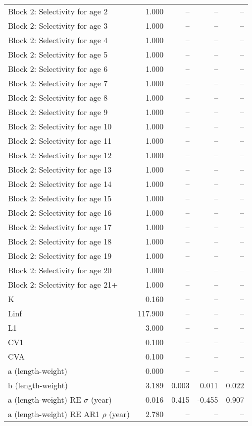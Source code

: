 \documentclass[
]{article}
\begin{document}
\begin{landscape}
\begin{longtable}[t]{lrrrr}
Block 2: Selectivity for age 2 & 1.000 & -- & -- & --\\
Block 2: Selectivity for age 3 & 1.000 & -- & -- & --\\
Block 2: Selectivity for age 4 & 1.000 & -- & -- & --\\
Block 2: Selectivity for age 5 & 1.000 & -- & -- & --\\
\addlinespace
Block 2: Selectivity for age 6 & 1.000 & -- & -- & --\\
Block 2: Selectivity for age 7 & 1.000 & -- & -- & --\\
Block 2: Selectivity for age 8 & 1.000 & -- & -- & --\\
Block 2: Selectivity for age 9 & 1.000 & -- & -- & --\\
Block 2: Selectivity for age 10 & 1.000 & -- & -- & --\\
\addlinespace
Block 2: Selectivity for age 11 & 1.000 & -- & -- & --\\
Block 2: Selectivity for age 12 & 1.000 & -- & -- & --\\
Block 2: Selectivity for age 13 & 1.000 & -- & -- & --\\
Block 2: Selectivity for age 14 & 1.000 & -- & -- & --\\
Block 2: Selectivity for age 15 & 1.000 & -- & -- & --\\
\addlinespace
Block 2: Selectivity for age 16 & 1.000 & -- & -- & --\\
Block 2: Selectivity for age 17 & 1.000 & -- & -- & --\\
Block 2: Selectivity for age 18 & 1.000 & -- & -- & --\\
Block 2: Selectivity for age 19 & 1.000 & -- & -- & --\\
Block 2: Selectivity for age 20 & 1.000 & -- & -- & --\\
\addlinespace
Block 2: Selectivity for age 21+ & 1.000 & -- & -- & --\\
K & 0.160 & -- & -- & --\\
Linf & 117.900 & -- & -- & --\\
L1 & 3.000 & -- & -- & --\\
CV1 & 0.100 & -- & -- & --\\
\addlinespace
CVA & 0.100 & -- & -- & --\\
a (length-weight) & 0.000 & -- & -- & --\\
b (length-weight) & 3.189 & 0.003 & 0.011 & 0.022\\
a (length-weight) RE $\sigma$ (year) & 0.016 & 0.415 & -0.455 & 0.907\\
a (length-weight) RE AR1 $\rho$ (year) & 2.780 & -- & -- & --\\*
\end{longtable}
\end{landscape}
\end{document}
